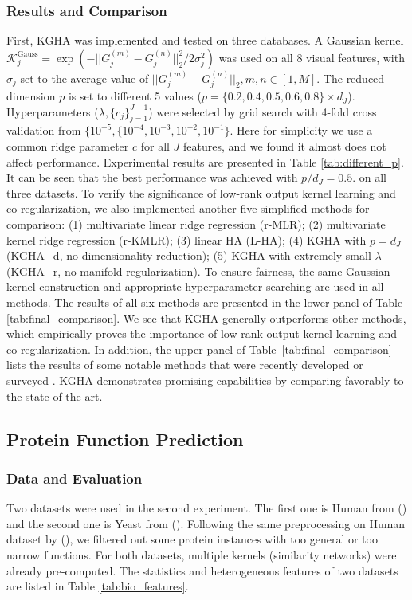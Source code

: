 \documentclass[a4paper]{article}
\begin{document}
\subsubsection{Results and Comparison}
First, KGHA was implemented and tested on three databases. A Gaussian kernel 
$\mathcal{K}^{\textrm{Gauss}}_j=\exp (-||G_j^{(m)}-G_j^{(n)}||_2^2/2\sigma^2_j)$ 
was used on all 8 visual features, with $\sigma_j$ set to the average value of $||G_j^{(m)}-G_j^{(n)}||_2, 
m,n\in[1,M]$. The reduced dimension $p$ is set to different 5 values ($p=\{0.2, 0.4,0.5, 0.6,0.8\}\times d_J$). 
Hyperparameters ($\lambda, \{c_j\}_{j=1}^{J-1}$) were selected by grid search with 4-fold cross validation from  
$\{10^{-5}, \{10^{-4},10^{-3},10^{-2},10^{-1}\}$. Here for simplicity we use a common ridge parameter $c$ for all $J$ features, and we found it almost does not 
affect performance. Experimental results are presented in Table \ref{tab:different_p}. It can be seen that the best performance was achieved with $p/d_J=0.5$.   
on all three datasets. 
To verify the significance of low-rank output kernel learning and co-regularization, we also implemented another five simplified methods for  
comparison: (1) multivariate linear ridge regression (r-MLR); (2) multivariate kernel ridge regression (r-KMLR); (3) linear HA (L-HA);    
(4) KGHA with $p=d_J$ (KGHA$-$d, no dimensionality reduction);  (5) KGHA with extremely small $\lambda$ (KGHA$-$r, no manifold regularization).  
To ensure fairness, the same Gaussian kernel construction and appropriate hyperparameter searching are used in all methods. The results of all six methods are presented in 
the lower panel of Table \ref{tab:final_comparison}. We see that KGHA generally outperforms other methods, which empirically proves the importance of
low-rank output kernel learning and co-regularization.  
In addition, the upper panel of Table~\ref{tab:final_comparison} lists
the results of some notable methods that were recently developed or
surveyed \citep{GMVS09,baseline,chen_2013_icml}. KGHA demonstrates
promising capabilities by comparing favorably to the state-of-the-art.

\subsection{Protein Function Prediction}
\subsubsection{Data and Evaluation}
Two datasets were used in the second experiment. 
The first one is \textsf{Human} from \citeauthor{Mostafavi_2010_Bioinfo} (\citeyear{Mostafavi_2010_Bioinfo}) and the 
second one is \textsf{Yeast} from \citeauthor{Tsuda_2005_BioInfor} (\citeyear{Tsuda_2005_BioInfor}). Following the same preprocessing on \textsf{Human} dataset 
by \citeauthor{Yu_2013_TBioinfo} (\citeyear{Yu_2013_TBioinfo}), we filtered out some protein instances with too general or too narrow functions. For both datasets, 
multiple kernels (similarity networks) were already pre-computed. The statistics and heterogeneous features of two datasets are listed in Table \ref{tab:bio_features}. 
\end{document}
